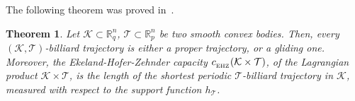 \documentclass{icmart}
\newtheorem{theorem}{Theorem}[section]
\theoremstyle{definition}
\begin{document}
%
%

The following theorem was proved in~\cite{AAO1}.
\begin{theorem} \label{Main-Theorem-From-AAO1}
Let ${\mathcal K}  \subset {\mathbb R}_q^n$, ${\mathcal T}  \subset {\mathbb R}_p^n$ be
two smooth  convex bodies.  Then, every $({\mathcal K},{\mathcal T})$-billiard trajectory is either a proper trajectory, or a gliding one.
Moreover, the Ekeland-Hofer-Zehnder capacity $c_{_{\rm EHZ}}({\mathcal K} \times {\mathcal T})$, of the Lagrangian product ${\mathcal K} \times {\mathcal T}$, is the length of the shortest periodic ${\mathcal T}$-billiard trajectory in ${\mathcal K}$, measured with respect to the support function $h_{\mathcal T}$. 
\end{theorem}
\end{document}
